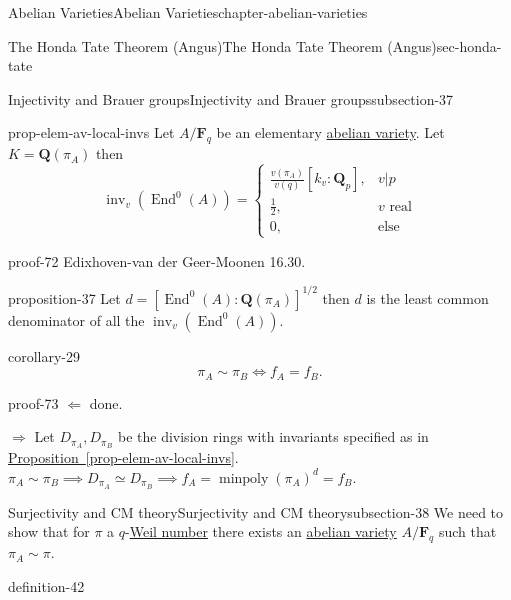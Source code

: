 \documentclass[oneside,10pt,]{book}
\numberwithin{equation}{section}
\newcommand{\lb}{[}
\newcommand{\rb}{]}
\newcommand{\QQ}{\mathbf{Q}}
\newcommand{\FF}{\mathbf{F}}
\DeclareMathOperator{\End}{End}
\newcommand{\amp}{&}
\begin{document}
\begin{chapterptx}{Abelian Varieties}{}{Abelian Varieties}{}{}{chapter-abelian-varieties}
\begin{sectionptx}{The Honda Tate Theorem (Angus)}{}{The Honda Tate Theorem (Angus)}{}{}{sec-honda-tate}
\begin{subsectionptx}{Injectivity and Brauer groups}{}{Injectivity and Brauer groups}{}{}{subsection-37}
\begin{proposition}{}{}{prop-elem-av-local-invs}
\hypertarget{p-425}{}%
Let \(A/\FF_q\) be an elementary \hyperref[def-buntes-abvar]{abelian variety}. Let \(K = \QQ(\pi_A)\) then%
\begin{equation*}
\operatorname{inv}_v(\End^0(A)) = \begin{cases} \frac{v(\pi_A)}{v(q)} [k_v: \QQ_p], \amp v|p\\ \frac 12,\amp v\text{ real}\\ 0, \amp \text{else}\end{cases}
\end{equation*}
%
\end{proposition}
\begin{proofptx}{}{proof-72}
\hypertarget{p-426}{}%
Edixhoven-van der Geer-Moonen 16.30.%
\end{proofptx}
\begin{proposition}{}{}{proposition-37}%
\hypertarget{p-427}{}%
Let \(d= \lb \End^0(A) : \QQ(\pi_A) \rb^{1/2}\) then \(d\) is the least common denominator of all the \(\operatorname{inv}_v(\End^0(A))\).%
\end{proposition}
\begin{corollary}{}{}{corollary-29}%
\hypertarget{p-428}{}%
%
\begin{equation*}
\pi_A\sim \pi_B \iff f_A = f_B\text{.}
\end{equation*}
%
\end{corollary}
\begin{proofptx}{}{proof-73}
\hypertarget{p-429}{}%
\(\Leftarrow\) done.%
\par
\hypertarget{p-430}{}%
\(\Rightarrow\) Let \(D_{\pi_A} , D_{\pi_B}\) be the division rings with invariants specified as in \hyperref[prop-elem-av-local-invs]{Proposition~\ref{prop-elem-av-local-invs}}. \(\pi_A\sim \pi_B \implies D_{\pi_A} \simeq D_{\pi_B} \implies f_A = \operatorname{minpoly}(\pi_A) ^d = f_B\).%
\end{proofptx}
\end{subsectionptx}
%
%
\typeout{************************************************}
\typeout{************************************************}
%
\begin{subsectionptx}{Surjectivity and CM theory}{}{Surjectivity and CM theory}{}{}{subsection-38}
\hypertarget{p-431}{}%
We need to show that for \(\pi\) a \(q\)-\hyperref[sec-honda-tate]{Weil number} there exists an \hyperref[def-buntes-abvar]{abelian variety} \(A/\FF_q\) such that \(\pi_A \sim \pi\).%
\begin{definition}{}{definition-42}%

\end{definition}
\end{subsectionptx}
\end{sectionptx}
\end{chapterptx}
\end{document}
